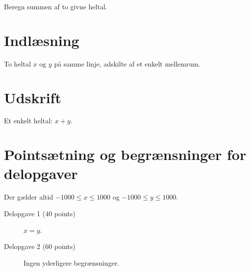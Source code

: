 
Beregn summen af to givne heltal.

\section*{Indlæsning}

To heltal $x$ og $y$ på samme linje, adskilte af et enkelt mellemrum.

\section*{Udskrift}

Et enkelt heltal: $x+y$.

\section*{Pointsætning og begrænsninger for delopgaver}

Der gælder altid $-1000\leq x \leq 1000$ og
$-1000\leq y \leq 1000$.

\begin{description}
\item[Delopgave 1 (40 points)] $x=y$.
\item[Delopgave 2 (60 points)] Ingen yderligere begrænsninger.
\end{description}
